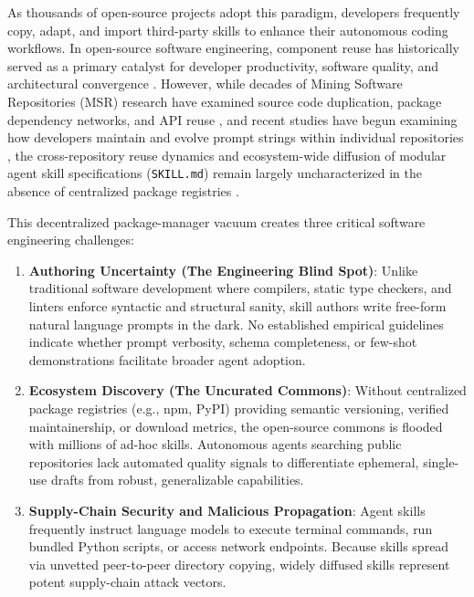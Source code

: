 \documentclass[12pt]{article}
\begin{document}
As thousands of open-source projects adopt this paradigm, developers frequently copy, adapt, and import third-party skills to enhance their autonomous coding workflows. In open-source software engineering, component reuse has historically served as a primary catalyst for developer productivity, software quality, and architectural convergence \cite{haefliger2008code,lopes2017dejavu}. However, while decades of Mining Software Repositories (MSR) research have examined source code duplication, package dependency networks, and API reuse \cite{mockus2002two,heinemann2011extents}, and recent studies have begun examining how developers maintain and evolve prompt strings within individual repositories \cite{tafreshipour2025prompting}, the cross-repository reuse dynamics and ecosystem-wide diffusion of modular agent skill specifications (\texttt{SKILL.md}) remain largely uncharacterized in the absence of centralized package registries \cite{gitskills2027}.

This decentralized package-manager vacuum creates three critical software engineering challenges:
\begin{enumerate}
    \item \textbf{Authoring Uncertainty (The Engineering Blind Spot)}: Unlike traditional software development where compilers, static type checkers, and linters enforce syntactic and structural sanity, skill authors write free-form natural language prompts in the dark. No established empirical guidelines indicate whether prompt verbosity, schema completeness, or few-shot demonstrations facilitate broader agent adoption.
    \item \textbf{Ecosystem Discovery (The Uncurated Commons)}: Without centralized package registries (e.g., npm, PyPI) providing semantic versioning, verified maintainership, or download metrics, the open-source commons is flooded with millions of ad-hoc skills. Autonomous agents searching public repositories lack automated quality signals to differentiate ephemeral, single-use drafts from robust, generalizable capabilities.
    \item \textbf{Supply-Chain Security and Malicious Propagation}: Agent skills frequently instruct language models to execute terminal commands, run bundled Python scripts, or access network endpoints. Because skills spread via unvetted peer-to-peer directory copying, widely diffused skills represent potent supply-chain attack vectors.
\end{enumerate}
\end{document}
